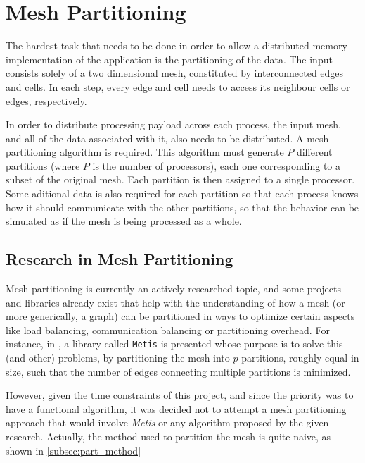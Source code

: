 \section{Mesh Partitioning}
\label{sec:partitioning}

The hardest task that needs to be done in order to allow a distributed memory implementation of the application is the partitioning of the data. The input consists solely of a two dimensional mesh, constituted by interconnected edges and cells. In each step, every edge and cell needs to access its neighbour cells or edges, respectively.

In order to distribute processing payload across each process, the input mesh, and all of the data associated with it, also needs to be distributed. A mesh partitioning algorithm is required. This algorithm must generate $P$ different partitions (where $P$ is the number of processors), each one corresponding to a subset of the original mesh. Each partition is then assigned to a single processor. Some aditional data is also required for each partition so that each process knows how it should communicate with the other partitions, so that the behavior can be simulated as if the mesh is being processed as a whole.

\subsection{Research in Mesh Partitioning}
\label{subsec:part_research}

Mesh partitioning is currently an actively researched topic, and some projects and libraries already exist that help with the understanding of how a mesh (or more generically, a graph) can be partitioned in ways to optimize certain aspects like load balancing, communication balancing or partitioning overhead. For instance, in \cite{metis}, a library called \texttt{Metis} is presented whose purpose is to solve this (and other) problems, by partitioning the mesh into $p$ partitions, roughly equal in size, such that the number of edges connecting multiple partitions is minimized.


However, given the time constraints of this project, and since the priority was to have a functional algorithm, it was decided not to attempt a mesh partitioning approach that would involve \textit{Metis} or any algorithm proposed by the given research. Actually, the method used to partition the mesh is quite naive, as shown in \cref{subsec:part_method}

